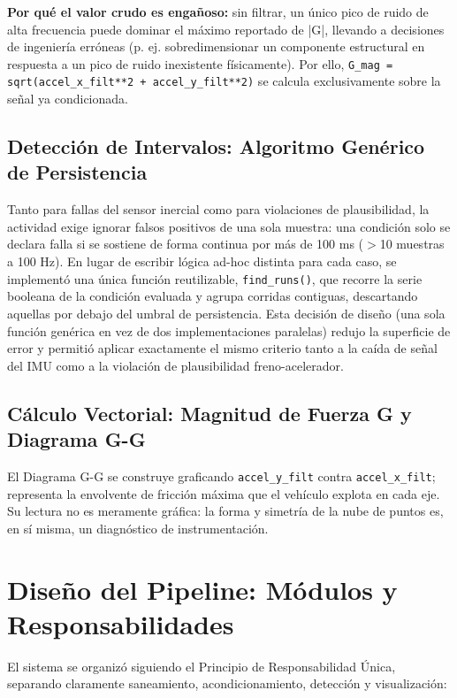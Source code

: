 \documentclass[12pt, letterpaper]{article}
\begin{document}
	\textbf{Por qué el valor crudo es engañoso:} sin filtrar, un único pico de ruido de alta frecuencia puede dominar el máximo reportado de |G|, llevando a decisiones de ingeniería erróneas (p. ej. sobredimensionar un componente estructural en respuesta a un pico de ruido inexistente físicamente). Por ello, \texttt{G\_mag = sqrt(accel\_x\_filt**2 + accel\_y\_filt**2)} se calcula exclusivamente sobre la señal ya condicionada.
	
	\subsection{Detección de Intervalos: Algoritmo Genérico de Persistencia}
	Tanto para fallas del sensor inercial como para violaciones de plausibilidad, la actividad exige ignorar falsos positivos de una sola muestra: una condición solo se declara falla si se sostiene de forma continua por más de 100 ms ($>$10 muestras a 100 Hz). En lugar de escribir lógica ad-hoc distinta para cada caso, se implementó una única función reutilizable, \texttt{find\_runs()}, que recorre la serie booleana de la condición evaluada y agrupa corridas contiguas, descartando aquellas por debajo del umbral de persistencia. Esta decisión de diseño (una sola función genérica en vez de dos implementaciones paralelas) redujo la superficie de error y permitió aplicar exactamente el mismo criterio tanto a la caída de señal del IMU como a la violación de plausibilidad freno-acelerador.
	
	\subsection{Cálculo Vectorial: Magnitud de Fuerza G y Diagrama G-G}
	El Diagrama G-G se construye graficando \texttt{accel\_y\_filt} contra \texttt{accel\_x\_filt}; representa la envolvente de fricción máxima que el vehículo explota en cada eje. Su lectura no es meramente gráfica: la forma y simetría de la nube de puntos es, en sí misma, un diagnóstico de instrumentación.
	
	\section{Diseño del Pipeline: Módulos y Responsabilidades}
	El sistema se organizó siguiendo el Principio de Responsabilidad Única, separando claramente saneamiento, acondicionamiento, detección y visualización:
	
\end{document}
